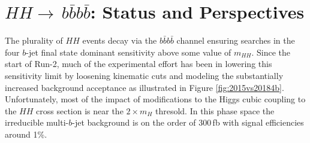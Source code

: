 
\newcommand*{\ifb}{fb$^{-1}$\xspace}
\newcommand*{\inbs}{nb$^{-1}$/s\xspace}
\newcommand*{\smhh}{SM $HH$\xspace}
\newcommand*{\bbbb}{\ensuremath{b\bar{b}b\bar{b}}\xspace}
\newcommand*{\bb}{\ensuremath{b\bar{b}}\xspace}
\newcommand*{\ttbar}{\ensuremath{t\bar{t}}\xspace}
\newcommand*{\hh}{\ensuremath{HH}\xspace}
\newcommand*{\bjet}{$b$-jet\xspace}
\newcommand*{\bjets}{$b$-jets\xspace}
\newcommand*{\btag}{$b$-tag\xspace}
\newcommand*{\btags}{$b$-tags\xspace}
\newcommand*{\btagging}{$b$-tagging\xspace}
\newcommand*{\btagged}{$b$-tagged\xspace}
\newcommand*{\mhh}{\ensuremath{m_{HH}}\xspace}
\newcommand*{\mh}{\ensuremath{m_{H}}\xspace}
\newcommand*{\pt}{\ensuremath{p_T}\xspace}

\section{$HH\to\,$\bbbb: Status and Perspectives}
\label{sec:HH4b}

The plurality of \hh events decay via the \bbbb channel ensuring searches in the four \bjet final state dominant sensitivity above some value of \mhh.
Since the start of Run-2, much of the experimental effort has been in lowering this sensitivity limit by loosening kinematic cuts
and modeling the substantially increased background acceptance as illustrated in Figure \ref{fig:2015vs20184b}.
Unfortunately, most of the impact of modifications to the Higgs cubic coupling to the \hh cross section is near the $2\times$\mh thresold.
In this phase space the irreducible multi-\bjet background is on the order of 300$\,$fb with signal efficiencies around 1\%.

